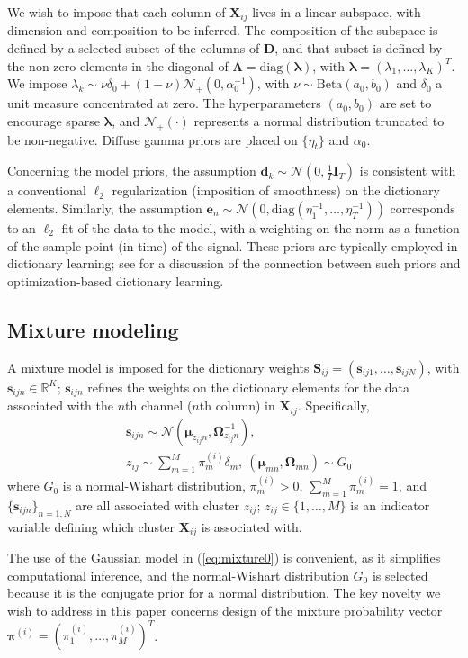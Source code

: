 \documentclass[journal]{IEEEtran}
\def\bf{\mathbf}
\newcommand{\beqs}{\begin{eqnarray}}
\newcommand{\eeqs}{\end{eqnarray}}
\newcommand{\Dmat}{{\bf D}}
\newcommand{\Imat}{{\bf I}}
\newcommand{\Smat}{{\bf S}}
\newcommand{\Xmat}{{\bf X}}
\newcommand{\dv}{\boldsymbol{d}}
\newcommand{\ev}{\boldsymbol{e}}
\newcommand{\sv}{\boldsymbol{s}}
\newcommand{\Lambdamat}{\boldsymbol{\Lambda}}
\newcommand{\Omegamat}{\boldsymbol{\Omega}}
\newcommand{\lambdav}{\boldsymbol{\lambda}}
\newcommand{\muv}{\boldsymbol{\mu}}
\newcommand{\piv}{\boldsymbol{\pi}}
\begin{document}
We wish to impose that each column of $\Xmat_{ij}$ lives in a linear subspace, with dimension and composition to be inferred. The composition of the subspace is defined by a selected subset of the columns of $\Dmat$, and that subset is defined by the non-zero elements in the diagonal of $\Lambdamat=\mbox{diag}(\lambdav)$, with $\lambdav=(\lambda_1,\dots,\lambda_K)^T$. We impose $\lambda_k\sim\nu\delta_0+(1-\nu)\mathcal{N}_+(0,\alpha_0^{-1})$, with $\nu\sim\mbox{Beta}(a_0,b_0)$ and $\delta_0$ a unit measure concentrated at zero. The hyperparameters $(a_0,b_0)$ are set to encourage sparse $\lambdav$, and $\mathcal{N}_+(\cdot)$ represents a normal distribution truncated to be non-negative. Diffuse gamma priors are placed on $\{\eta_t\}$ and $\alpha_0$.

Concerning the model priors, the assumption $\dv_k\sim\mathcal{N}(0,\frac{1}{T}\Imat_T)$ is consistent with a conventional $\ell_2$ regularization (imposition of smoothness) on the dictionary elements. Similarly, the assumption $\ev_n\sim\mathcal{N}(0,\mbox{diag}(\eta_1^{-1},\dots,\eta_T^{-1}))$ corresponds to an $\ell_2$ fit of the data to the model, with a weighting on the norm as a function of the sample point (in time) of the signal. These priors are typically employed in dictionary learning; see \cite{Zhou12} for a discussion of the connection between such priors and optimization-based dictionary learning.

\subsection{Mixture modeling}

A mixture model is imposed for the dictionary weights $\Smat_{ij}=(\sv_{ij1},\dots,\sv_{ijN})$, with $\sv_{ijn}\in\mathbb{R}^K$; $\sv_{ijn}$ refines the weights on the dictionary elements for the data associated with the $n$th channel ($n$th column) in $\Xmat_{ij}$. Specifically,
\beqs & \sv_{ijn}\sim\mathcal{N}(\muv_{{z_{ij}n}},\Omegamat_{{z_{ij}n}}^{-1}),\label{eq:mixture0}\\ &z_{ij}\sim\sum_{m=1}^M \pi^{(i)}_m\delta_m,~(\muv_{{mn}},\Omegamat_{{mn}})\sim G_0\label{eq:mixture}\eeqs
where $G_0$ is a normal-Wishart distribution, $\pi^{(i)}_m>0$, $\sum_{m=1}^M \pi^{(i)}_m=1$, and $\{\sv_{ijn}\}_{n=1,N}$ are all associated with cluster $z_{ij}$; $z_{ij}\in\{1,\dots,M\}$ is an indicator variable defining which cluster $\Xmat_{ij}$ is associated with. 

The use of the Gaussian model in (\ref{eq:mixture0}) is convenient, as it simplifies computational inference, and the normal-Wishart distribution $G_0$ is selected because it is the conjugate prior for a normal distribution. The key novelty we wish to address in this paper concerns design of the mixture probability vector $\piv^{(i)}=(\pi_1^{(i)},\dots,\pi_M^{(i)})^T$.
\end{document}
